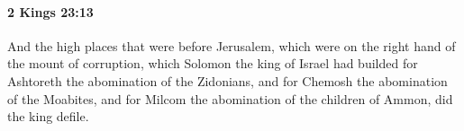 
		\paragraph{2 Kings 23:13} %
			\label{2KINGS-23-13}

			And the high places that were before Jerusalem, which were on the right hand of the mount of corruption, which Solomon the king of Israel had builded for Ashtoreth the abomination of the Zidonians, and for Chemosh the abomination of the Moabites, and for Milcom the abomination of the children of Ammon, did the king defile.


